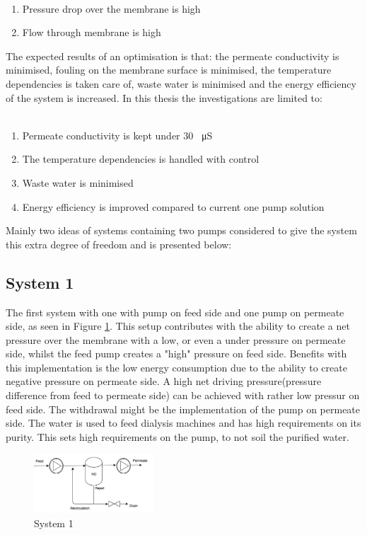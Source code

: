\\
\begin{enumerate}
\item Pressure drop over the membrane is high
\item Flow through membrane is high
\end{enumerate}
The expected results of an optimisation is that: the permeate conductivity is minimised, fouling on the membrane surface is minimised, the temperature dependencies is taken care of, waste water is minimised and the energy efficiency of the system is increased. In this thesis the investigations are limited to:\\
\\
\begin{enumerate}
\item Permeate conductivity is kept under 30 \SI{}{\micro\siemens}
\item The temperature dependencies is handled with control
\item Waste water is minimised
\item Energy efficiency is improved compared to current one pump solution
\end{enumerate}
Mainly two ideas of systems containing two pumps considered to give the system this extra degree of freedom and is presented below:

\subsection{System 1}
 The first system with one with pump on feed side and one pump on permeate side, as seen in Figure \ref{fig:FlowCInves1}. This setup contributes with the ability to create a net pressure over the membrane with a low, or even a under pressure on permeate side, whilst the feed pump creates a "high" pressure on feed side. Benefits with this implementation is the low energy consumption due to the ability to create negative pressure on permeate side. A high net driving pressure(pressure difference from feed to permeate side) can be achieved with rather low pressur on feed side. The withdrawal might be the implementation of the pump on permeate side. The water is used to feed dialysis machines and has high requirements on its purity. This sets high requirements on the pump, to not soil the purified water. 

\begin{figure}[h]
    \centering
    \includegraphics[width=0.4\textwidth]{FlowCInves1}
    \caption{System 1}
    \label{fig:FlowCInves1}
\end{figure}

